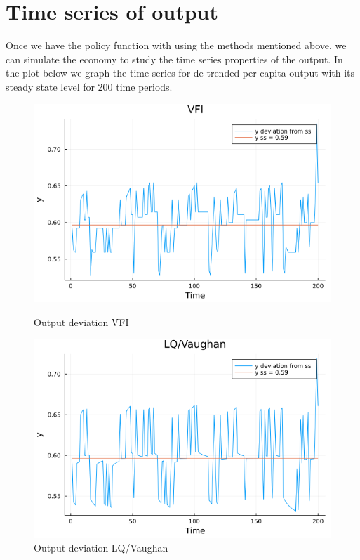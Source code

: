 \documentclass[12pt]{article}
\begin{document}
\section{Time series of output}
Once we have the policy function with using the methods mentioned above, we can simulate the economy to study the time series properties of the output. In the plot below we graph the time series for de-trended per capita output with its steady state level for 200 time periods.
\begin{figure}[h]
    \centering
    \begin{minipage}{0.45\textwidth}
        \centering
        \includegraphics[width=1.2\textwidth]{vfi_y_sim.png} %
        \caption{Output deviation VFI}
    \end{minipage}\hfill
    \begin{minipage}{0.45\textwidth}
        \centering
        \includegraphics[width=1.2\textwidth]{LQ_y_sim.png} %
        \caption{Output deviation LQ/Vaughan}
    \end{minipage}
\end{figure}
\end{document}
